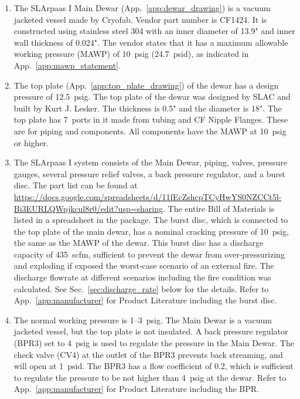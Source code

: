 \begin{enumerate}
    \item The SLArpaas I Main Dewar (App.~\ref{app:dewar_drawing}) is a vacuum jacketed 
    vessel made by Cryofab. Vendor part number is CF1424.
    It is constructed using stainless steel 304 with an inner diameter of 13.9" 
    and inner wall thickness of 0.024". 
    The vendor states that it has a maximum allowable working pressure (MAWP) 
    of 10~psig (24.7~psid), as indicated in App.~\ref{app:mawp_statement}.
    \item The top plate (App.~\ref{app:top_plate_drawing}) of the dewar has a design 
    pressure of 12.5~psig. 
    The top plate of the dewar was designed by SLAC and built by Kurt J. Lesker.
    The thickness is 0.5" and the diameter is 18". 
    The top plate has 7~ports in it made from tubing and CF Nipple Flanges. 
    These are for piping and components. All components have the MAWP at 10~psig or higher.
    \item The SLArpaas I system consists of the Main Dewar, piping, valves, pressure gauges, 
    several pressure relief valves, a back pressure regulator, and a burst disc. 
    The part list can be found at 
    \url{https://docs.google.com/spreadsheets/d/11fEcZshcpTCyHwYS0NZCCt5l-Bi3EURLQWpjkcul8r0/edit?usp=sharing}. 
    The entire Bill of Materials is listed in a spreadsheet in the package. 
    The burst disc, which is connected to the top plate of the main dewar, 
    has a nominal cracking pressure of 10~psig, the same as the MAWP of the dewar. 
    This burst disc has a discharge capacity of 435~scfm, sufficient to prevent the dewar 
    from over-pressurizing and exploding if exposed the worst-case scenario of an external fire. 
    The discharge flowrate at different scenarios including the fire condition was calculated. 
    See Sec.~\ref{sec:discharge_rate} below for the details. 
    Refer to App.~\ref{app:manufacturer} for Product Literature including the burst disc.
    \item The normal working pressure is 1--3~psig. 
    The Main Dewar is a vacuum jacketed vessel, but the top plate is not insulated. 
    A back pressure regulator (BPR3) set to 4~psig is used to regulate the pressure in the Main Dewar.
    The check valve (CV4) at the outlet of the BPR3 prevents back streaming, and will open
    at 1~psid. 
    The BPR3 has a flow coefficient of 0.2, which is sufficient to regulate the pressure to 
    be not higher than 4~psig at the dewar. 
    Refer to App.~\ref{app:manufacturer} for Product Literature including the BPR.
\end{enumerate}
